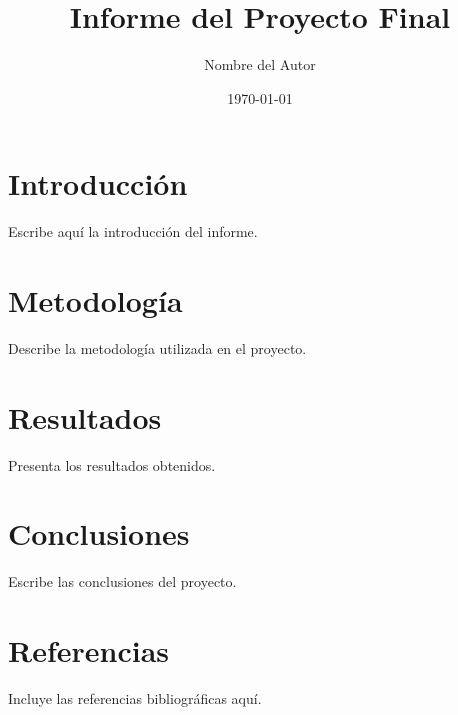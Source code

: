 \documentclass[a4paper,12pt]{article}
\title{Informe del Proyecto Final}
\author{Nombre del Autor}
\date{\today}
\begin{document}
\maketitle
\tableofcontents
\newpage

\section{Introducción}
Escribe aquí la introducción del informe.

\section{Metodología}
Describe la metodología utilizada en el proyecto.

\section{Resultados}
Presenta los resultados obtenidos.

\section{Conclusiones}
Escribe las conclusiones del proyecto.

\section{Referencias}
Incluye las referencias bibliográficas aquí.
\end{document}
